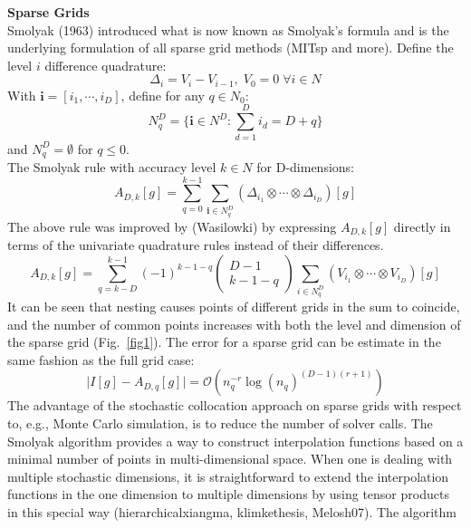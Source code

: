 \documentclass{article}
\begin{document}
 \textbf{Sparse Grids}\\
 Smolyak (1963) introduced what is now known as Smolyak's formula and is the underlying formulation
 of all sparse grid methods (MITsp and more). Define the level $i$ difference quadrature:
 \begin{equation}
\Delta_i = V_i - V_{i-1},  \; V_0 = 0 \; \forall i \in N
\end{equation}
With $\textbf{i} = [i_1, \cdots, i_D]$, define for any $q \in N_0$:
 \begin{equation}
N_q^D = \lbrace \textbf{i} \in N^D : \sum_{d=1}^{D} i_d=D + q \rbrace 
\end{equation}
and $N_{q}^D = \emptyset$ for $q \le 0$. \\
 The Smolyak rule with accuracy level $k \in N$ for D-dimensions:
 \begin{equation}
A_{D,k}[g] = \sum_{q=0}^{k-1}\sum_{\textbf{i}\in N_{q}^D} (\Delta_{i_1} \otimes \cdots \otimes \Delta_{i_D})[g]
\end{equation}
The above rule was improved by (Wasilowki) by expressing $A_{D,k}[g]$ directly
in terms of the univariate quadrature rules instead of their differences.
\begin{equation}
A_{D,k}[g] = \sum_{q=k-D}^{k-1}(-1)^{k-1-q}\begin{pmatrix}D-1 \\ k-1-q \end{pmatrix}
\sum_{i \in N_q^D}(V_{i_1} \otimes \cdots \otimes V_{i_D})[g]
\end{equation}
 It can be seen that nesting causes points of different grids in the sum to coincide, and the number of
 common points increases with both the level and dimension of the sparse grid (Fig.~\ref{fig1}).
 The error for a sparse grid can be estimate in the same fashion as the full grid case:
 \begin{equation}
\lvert I[g] -A_{D,q}[g] \rvert = \mathcal{O}(n_{q}^{-r}\log(n_q)^{(D-1)(r+1)})
\end{equation}
 The advantage of the stochastic collocation approach on sparse grids with respect to, e.g., Monte Carlo 
 simulation, is to reduce the number of solver calls.
 The Smolyak algorithm provides a way to construct interpolation functions based on a minimal number
 of points in multi-dimensional space. When one is dealing with multiple stochastic dimensions, it is 
 straightforward to extend the interpolation functions in the one dimension to multiple dimensions by 
 using tensor products in this special way (hierarchicalxiangma, klimkethesis, Melosh07). The algorithm 
\end{document}
